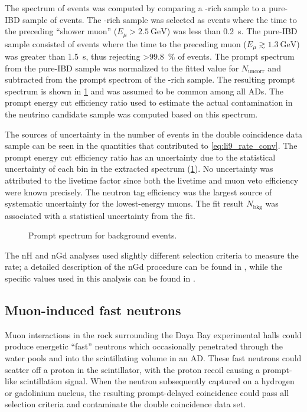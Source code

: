 The spectrum of \li{} events was computed
by comparing a \li{}-rich sample to a pure-IBD sample of events.
The \li{}-rich sample was selected as events
where the time to the preceding ``shower muon'' ($E_\mu > \SI{2.5}{\GeV}$)
was less than \SI{0.2}{\s}.
The pure-IBD sample consisted of events
where the time to the preceding muon ($E_\mu \gtrsim \SI{1.3}{\GeV}$)
was greater than \SI{1.5}{\s},
thus rejecting \SI{>99.8}{\percent} of \li{} events.
The prompt spectrum from the pure-IBD sample
was normalized to the fitted value for $N_\text{uncorr}$
and subtracted from the prompt spectrom of the \li{}-rich sample.
The resulting \li{} prompt spectrum is shown in \cref{fig:li9_spec}
and was assumed to be common among all ADs.
The prompt energy cut efficiency ratio
used to estimate the actual contamination in the neutrino candidate sample
was computed based on this spectrum.

The sources of uncertainty in the number of \li{} events
in the double coincidence data sample
can be seen in the quantities that contributed to \cref{eq:li9_rate_conv}.
The prompt energy cut efficiency ratio has an uncertainty
due to the statistical uncertainty of each bin in the extracted \li{} spectrum
(\cref{fig:li9_spec}).
No uncertainty was attributed to the livetime factor since
both the livetime and muon veto efficiency were known precisely.
The neutron tag efficiency
was the largest source of systematic uncertainty for the lowest-energy muons.
The fit result $N_\text{bkg}$ was associated with a statistical uncertainty
from the fit.

\begin{figure}
    \caption{
        Prompt spectrum for \li{} background events.
    }
    \label{fig:li9_spec}
\end{figure}

The nH and nGd analyses used slightly different selection criteria
to measure the \li{} rate;
a detailed description of the nGd procedure can be found in \cite{chris_li9},
while the specific values used in this analysis can be found in \cite{jinjing_2020may}.


\subsection{Muon-induced fast neutrons}
\label{subsec:fastn}

Muon interactions in the rock surrounding the Daya Bay experimental halls
could produce energetic ``fast'' neutrons
which occasionally penetrated through the water pools
and into the scintillating volume in an AD.
These fast neutrons could scatter off a proton in the scintillator,
with the proton recoil causing a prompt-like scintillation signal.
When the neutron subsequently captured on a hydrogen or gadolinium nucleus,
the resulting prompt-delayed coincidence
could pass all selection criteria and contaminate the double coincidence data set.

